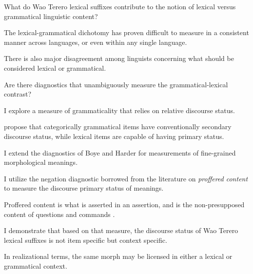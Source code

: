 \documentclass{beamer}
\begin{document}
\maketitle

\begin{frame}{What do Wao Terero lexical suffixes contribute to the notion of lexical versus grammatical linguistic content?}

  The lexical-grammatical dichotomy has proven difficult to measure in a consistent manner across languages, or even within any single language.

  \vfill
  
  There is also major disagreement among linguists concerning what should be considered lexical or grammatical.

\end{frame}
  
\begin{frame}{Are there diagnostics that unambiguously measure the grammatical-lexical contrast?}
  
  I explore a measure of grammaticality that relies on relative discourse status.

  \vfill

  \citet{Boye2012, Boye2023} propose that categorically grammatical items have conventionally secondary discourse status, while lexical items are capable of having primary status.

\end{frame}

\begin{frame}{I extend the diagnostics of Boye and Harder for measurements of fine-grained morphological meanings.}
  
  I utilize the negation diagnostic borrowed from the literature on \emph{proffered content} to measure the discourse primary status of meanings.

  \vfill

  Proffered content is what is asserted in an assertion, and is the non-presupposed content of questions and commands \citep{Roberts2012}.

\end{frame}

\begin{frame}{I demonstrate that based on that measure, the discourse status of Wao Terero lexical suffixes is not item specific but context specific.}
  
  In realizational terms, the same morph may be licensed in either a lexical or grammatical context.

\end{frame}
\end{document}
